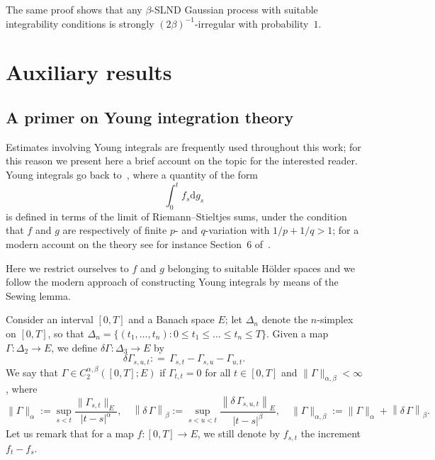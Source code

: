 \documentclass[10pt]{article}
\newcommand{\assign}{:=}
\newcommand{\mathd}{\mathrm{d}}
\begin{document}
\begin{remark}
  The same proof shows that any $\beta$\mbox{-}SLND Gaussian process with
  suitable integrability conditions is strongly $(2 \beta)^{-
  1}$\mbox{-}irregular with probability~$1$.
\end{remark}

\appendix
\section{Auxiliary results}\label{appendix}

\subsection{A primer on Young integration theory}\label{appendixA1}

Estimates involving Young integrals are frequently used throughout this work;
for this reason we present here a brief account on the topic for the
interested reader. Young integrals go back to~{\cite{young}}, where a quantity
of the form
\[ \int_0^t f_s \mathd g_s \]
is defined in terms of the limit of Riemann--Stieltjes sums, under the
condition that $f$ and $g$ are respectively of finite $p$\mbox{-} and
$q$\mbox{-}variation with $1 / p + 1 / q > 1$; for a modern account on the
theory see for instance Section~6 of~{\cite{frizvictoir}}.

Here we restrict ourselves to $f$ and $g$ belonging to suitable H\"{o}lder
spaces and we follow the modern approach of constructing Young integrals by
means of the Sewing lemma.

Consider an interval $[0, T]$ and a Banach space $E$; let $\Delta_n$ denote
the $n$\mbox{-}simplex on $[0, T]$, so that $\Delta_n = \{ (t_1, \ldots, t_n)
: 0 \leqslant t_1 \leqslant \ldots \leqslant t_n \leqslant T \}$. Given a map
$\Gamma : \Delta_2 \rightarrow E$, we define $\delta \Gamma : \Delta_3
\rightarrow E$ by
\[ \delta \Gamma_{s, u, t} : = \, \Gamma_{s, t} - \Gamma_{s, u} - \Gamma_{u,
   t} . \]
We say that $\Gamma \in C^{\alpha, \beta}_2 ([0, T] ; E)$ if $\Gamma_{t, t} =
0$ for all $t \in [0, T]$ and $\| \Gamma \|_{\alpha, \beta} < \infty$, where
\[ \| \Gamma \|_{\alpha} \assign \sup_{s < t} \frac{\| \Gamma_{s, t} \|_E}{| t
   - s |^{\alpha}}, \quad \left\| \delta \, \Gamma \right\|_{\beta} \assign
   \sup_{s < u < t} \frac{\left\| \delta \, \Gamma_{s, u, t} \right\|_E}{| t -
   s |^{\beta}}, \quad \| \Gamma \|_{\alpha, \beta} \assign \| \Gamma
   \|_{\alpha} + \left\| \delta \, \Gamma \right\|_{\beta} . \]
Let us remark that for a map $f : [0, T] \rightarrow E$, we still denote by
$f_{s, t}$ the increment $f_t - f_s$.
\end{document}
